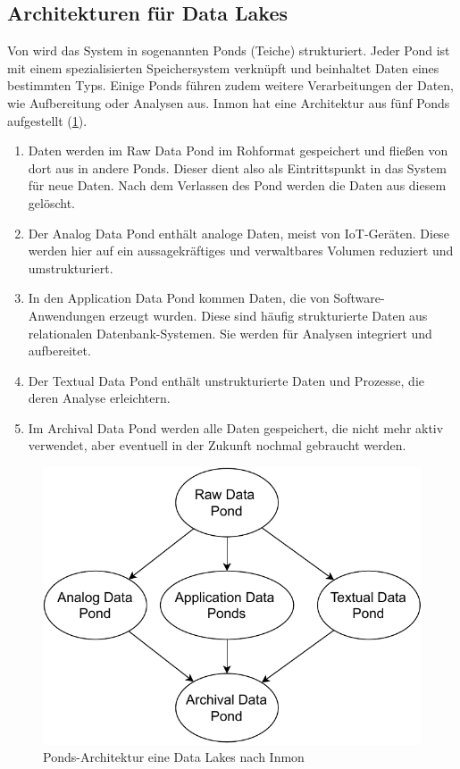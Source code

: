 \subsection{Architekturen für Data Lakes}
Von \textcite{inmon2016data} wird das System in sogenannten Ponds (Teiche) strukturiert.
Jeder Pond ist mit einem spezialisierten Speichersystem verknüpft und beinhaltet Daten eines bestimmten Typs.
Einige Ponds führen zudem weitere Verarbeitungen der Daten, wie Aufbereitung oder Analysen aus.
Inmon hat eine Architektur aus fünf Ponds aufgestellt (\cref{fig:datalake-ponds}).
\begin{enumerate}
    \item Daten werden im Raw Data Pond im Rohformat gespeichert und fließen von dort aus in andere Ponds.
    Dieser dient also als Eintrittspunkt in das System für neue Daten.
    Nach dem Verlassen des Pond werden die Daten aus diesem gelöscht.
    \item Der Analog Data Pond enthält analoge Daten, meist von IoT-Geräten.
    Diese werden hier auf ein aussagekräftiges und verwaltbares Volumen reduziert und umstrukturiert.
    \item In den Application Data Pond kommen Daten, die von Software-Anwendungen erzeugt wurden.
    Diese sind häufig strukturierte Daten aus relationalen Daten\-bank-Systemen.
    Sie werden für Analysen integriert und aufbereitet.
    \item Der Textual Data Pond enthält unstrukturierte Daten und Prozesse, die deren Analyse erleichtern.
    \item Im Archival Data Pond werden alle Daten gespeichert, die nicht mehr aktiv verwendet, aber eventuell in der Zukunft nochmal gebraucht werden.
\end{enumerate}
\begin{figure}
    \centering
    \includegraphics[width=.8\textwidth]{Grafiken/Grundlagen-Ponds.pdf}
    \caption{Ponds-Architektur eine Data Lakes nach Inmon}
    \label{fig:datalake-ponds}
\end{figure}


